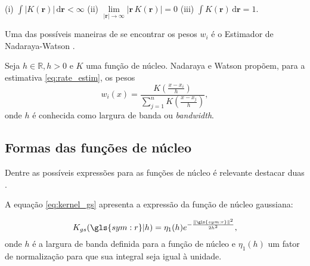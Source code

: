 \begin{center}
(i) $\int \lvert K(\boldsymbol{r})\rvert \,\mathrm{d}\boldsymbol{r} < \infty $
\;\;\;\;\;(ii) $\underset{ \lvert\boldsymbol{r} \rvert \to \infty }{\lim} 
				\lvert \boldsymbol{r} \, K(\boldsymbol{r})\rvert =0$ 
\;\;\;\;\;(iii) $\int \! K(\boldsymbol{r})	\,\mathrm{d}\boldsymbol{r} = 1 $.
\end{center}

Uma das possíveis maneiras de se encontrar os pesos $w_i$ é o 
Estimador de Nadaraya-Watson \citep{nadaraya_1965}. 

Seja $h \in \mathbb{R}, h > 0$ e $K$ uma função de núcleo. 
Nadaraya e Watson propõem, para a estimativa \eqref{eq:rate_estim}, os pesos
\begin{equation}
	\ensuremath{
		w_i(x) = \frac{ K\left( \frac{x - x_i}{h} \right)}
					  {\sum_{j=1}^{n} K\left( \frac{x - x_j}{h} \right) },
	}
\label{eq:rate_wi}
\end{equation}
onde $h$ é conhecida como largura de banda ou \emph{bandwidth}.



\subsection{Formas das funções de núcleo}

Dentre as possíveis expressões para as funções de núcleo é relevante destacar duas \citep{kagan_2000}. 

A equação \eqref{eq:kernel_gs} apresenta a expressão da função de núcleo gaussiana:

\begin{equation}
	\ensuremath{
		K_{gs}(\gls{sym:r}\arrowvert h) = \eta_1(h)
			e^{- \frac{\|\gls{sym:r}\|^2}
 				 	  {2 h^2 }},
 	}
\label{eq:kernel_gs}
\end{equation}
onde $h$ é a largura de banda definida para a função de núcleo e $\eta_1(h)$ um fator de normalização
para que sua integral seja igual à unidade.


